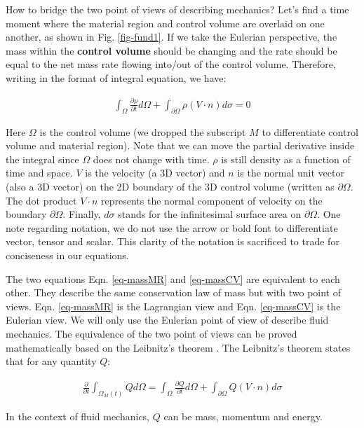 \documentclass[11pt, letterpaper]{report}
\begin{document}
How to bridge the two point of views of describing mechanics? Let's find a time moment where the
material region and control volume are overlaid on one another, as shown in Fig. \ref{fig-fund1}.
If we take the Eulerian perspective, the mass within the {\bf control volume} should be changing
and the rate should be equal to the net mass rate flowing into/out of the control volume. Therefore,
writing in the format of integral equation, we have:

\begin{align}\label{eq-massCV}
   \int_{\Omega}\frac{\partial \rho}{\partial t}d\Omega + \int_{\partial \Omega}\rho (V\cdot n)
   d\sigma = 0
\end{align}

Here $\Omega$ is the control volume (we dropped the subscript $M$ to differentiate control volume
and material region). Note that we can move the partial derivative inside the integral since
$\Omega$ does not change with time. $\rho$ is still density as a function of time and space. $V$ is
the velocity (a 3D vector) and $n$ is the normal unit vector (also a 3D vector) on the 2D boundary
of the 3D control volume (written as $\partial \Omega$. The dot product $V\cdot n$ represents the
normal component of velocity on the boundary $\partial \Omega$. Finally, $d\sigma$ stands for the
infinitesimal surface area on $\partial \Omega$. One note regarding notation, we do not use the
arrow or bold font to differentiate vector, tensor and scalar. This clarity of the notation is
sacrificed to trade for conciseness in our equations.  \paraspace

The two equations Eqn. \ref{eq-massMR} and \ref{eq-massCV} are equivalent to each other. They
describe the same conservation law of mass but with two point of views. Eqn.
\ref{eq-massMR} is the Lagrangian view and Eqn. \ref{eq-massCV} is the Eulerian view. We will only use
the Eulerian point of view of describe fluid mechanics. The equivalence of the two point of views
can be proved mathematically based on the Leibnitz's theorem \cite{panton2013incompressible}. The
Leibnitz's theorem states that for any quantity $Q$:

\begin{align}\label{eq-Leib}
   \frac{\partial}{\partial t}\int_{\Omega_M(t)}Q d\Omega = \int_\Omega \frac{\partial Q}{\partial
   t}d\Omega + \int_{\partial\Omega}Q (V\cdot n)d\sigma
\end{align}

In the context of fluid mechanics, $Q$ can be mass, momentum and energy.
\paraspace
\end{document}
